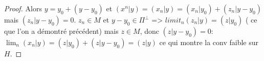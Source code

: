 \begin{proof}
	 Alors $y=y_0+(y-y_0)$ et $(x^n|y)=(x_n|y)=(x_n|y_0)+(z_n|y-y_0)$ mais $(z_n|y-y_0)=0$. $z_n\in M$ et $y-y_0\in Π^\perp$ => $limit_n (z_n|y)=(z|y_0)$ ( ce que l'on a démontré précédent)
	 mais $z\in M$, donc $(z|y-y_0)=0$: $\lim_n(x_n|y)=(z|y_0)+(z|y-y_0)=(z|y)$ ce qui montre la conv faible sur $H$.
\end{proof}

